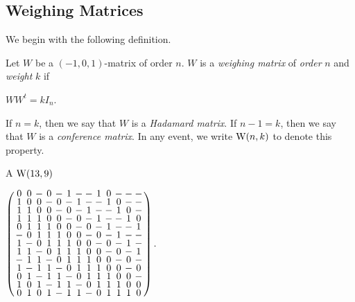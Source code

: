 \documentclass[../../../main]{subfiles}
\begin{document}

\subsection{Weighing Matrices}

We begin with the following definition.

\begin{defin}\label{weighing matrix}
  Let $W$ be a $(-1,0,1)$-matrix of order $n$. $W$ is a {\it weighing matrix} of {\it order} $n$ and {\it weight} $k$ if
  \begin{defenum}
  \item $WW^t = kI_n$.
  \end{defenum}
  If $n=k$, then we say that $W$ is a {\it Hadamard matrix}. If $n-1=k$, then we say that $W$ is a {\it conference
    matrix}. In any event, we write $\text{W}(n,k)$ to denote
  this property. 
\end{defin}

\begin{ex}
  A $\text{W}(13,9)$
  \begin{defenum}
  \item\label{ex-balanced-w-matrix} $
    \left(
      \arraycolsep=1.25pt\def\arraystretch{0.625}
      \begin{array}{ccccccccccccc}
        0&0&-&0&-&1&-&-&1&0&-&-&-\\
        1&0&0&-&0&-&1&-&-&1&0&-&-\\
        1&1&0&0&-&0&-&1&-&-&1&0&-\\
        1&1&1&0&0&-&0&-&1&-&-&1&0\\
        0&1&1&1&0&0&-&0&-&1&-&-&1\\
        -&0&1&1&1&0&0&-&0&-&1&-&-\\
        1&-&0&1&1&1&0&0&-&0&-&1&-\\
        1&1&-&0&1&1&1&0&0&-&0&-&1\\
        -&1&1&-&0&1&1&1&0&0&-&0&-\\
        1&-&1&1&-&0&1&1&1&0&0&-&0\\
        0&1&-&1&1&-&0&1&1&1&0&0&-\\
        1&0&1&-&1&1&-&0&1&1&1&0&0\\
        0&1&0&1&-&1&1&-&0&1&1&1&0\\
      \end{array}
    \right).
    $
  \end{defenum}
\end{ex}
\end{document}
